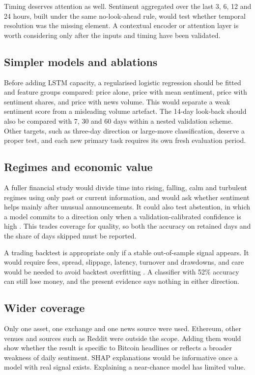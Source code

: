 Timing deserves attention as well. Sentiment aggregated over the last 3, 6, 12 and 24 hours, built under the same no-look-ahead rule, would test whether temporal resolution was the missing element. A contextual encoder or attention layer is worth considering only after the inputs and timing have been validated.

\subsection{Simpler models and ablations}
Before adding LSTM capacity, a regularised logistic regression should be fitted and feature groups compared: price alone, price with mean sentiment, price with sentiment shares, and price with news volume. This would separate a weak sentiment score from a misleading volume artefact. The 14-day look-back should also be compared with 7, 30 and 60 days within a nested validation scheme. Other targets, such as three-day direction or large-move classification, deserve a proper test, and each new primary task requires its own fresh evaluation period.

\subsection{Regimes and economic value}
A fuller financial study would divide time into rising, falling, calm and turbulent regimes using only past or current information, and would ask whether sentiment helps mainly after unusual announcements. It could also test abstention, in which a model commits to a direction only when a validation-calibrated confidence is high \cite{guo2017}. This trades coverage for quality, so both the accuracy on retained days and the share of days skipped must be reported.

A trading backtest is appropriate only if a stable out-of-sample signal appears. It would require fees, spread, slippage, latency, turnover and drawdowns, and care would be needed to avoid backtest overfitting \cite{bailey2014}. A classifier with 52\% accuracy can still lose money, and the present evidence says nothing in either direction.

\subsection{Wider coverage}
Only one asset, one exchange and one news source were used. Ethereum, other venues and sources such as Reddit were outside the scope. Adding them would show whether the result is specific to Bitcoin headlines or reflects a broader weakness of daily sentiment. SHAP explanations would be informative once a model with real signal exists. Explaining a near-chance model has limited value.
